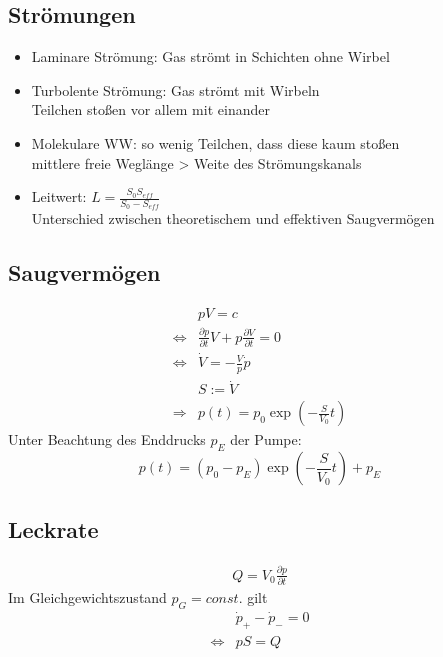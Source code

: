 \subsection{Strömungen}
\begin{itemize}
    \item Laminare Strömung: Gas strömt in Schichten ohne Wirbel
    \item Turbolente Strömung: Gas strömt mit Wirbeln\\
    \to Teilchen stoßen vor allem mit einander
    \item Molekulare WW: so wenig Teilchen, dass diese kaum stoßen\\
    \to mittlere freie Weglänge > Weite des Strömungskanals
    \item Leitwert: $L=\frac{S_0S_{eff}}{S_0-S_{eff}}$\\
    \to Unterschied zwischen theoretischem und effektiven Saugvermögen
\end{itemize}
\subsection{Saugvermögen}
\begin{align*}
    &pV=c\\
    \iff& \frac{\partial p}{\partial t} V + p\frac{\partial V}{\partial t}=0\\
    \iff& \dot{V}=-\frac{V}{p}\dot{p}\\
    &S:=\dot{V}\\
    \Rightarrow& p(t)=p_0\exp{\left(-\frac{S}{V_0}t\right)} 
\end{align*}
Unter Beachtung des Enddrucks $p_E$ der Pumpe:
\begin{equation*}
    p(t)=(p_0-p_E)\exp{\left(-\frac{S}{V_0}t\right)}+p_E
\end{equation*}
\subsection{Leckrate}
\begin{align*}
    Q=V_0\frac{\partial p}{\partial t}
\end{align*}
Im Gleichgewichtszustand $p_G=const.$ gilt 
\begin{align*}
    &\dot{p}_+-\dot{p}_-=0\\
    \iff& pS=Q
\end{align*}
